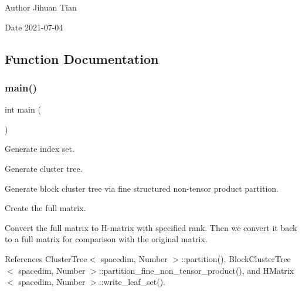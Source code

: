 \begin{DoxyAuthor}{Author}
Jihuan Tian 
\end{DoxyAuthor}
\begin{DoxyDate}{Date}
2021-\/07-\/04 
\end{DoxyDate}


\subsection{Function Documentation}
\mbox{\label{hmatrix-bct-struct-with-rank_8cc_ae66f6b31b5ad750f1fe042a706a4e3d4}} 
\subsubsection{\texorpdfstring{main()}{main()}}
{\footnotesize\ttfamily int main (\begin{DoxyParamCaption}{ }\end{DoxyParamCaption})}

Generate index set.

Generate cluster tree.

Generate block cluster tree via fine structured non-\/tensor product partition.

Create the full matrix.

Convert the full matrix to H-\/matrix with specified rank. Then we convert it back to a full matrix for comparison with the original matrix.

References Cluster\+Tree$<$ spacedim, Number $>$\+::partition(), Block\+Cluster\+Tree$<$ spacedim, Number $>$\+::partition\+\_\+fine\+\_\+non\+\_\+tensor\+\_\+product(), and H\+Matrix$<$ spacedim, Number $>$\+::write\+\_\+leaf\+\_\+set().

